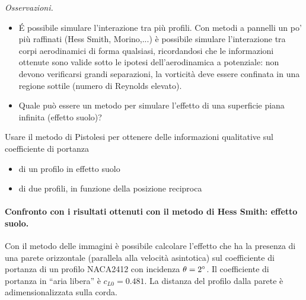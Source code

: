 \vspace{0.5cm}
\textit{Osservazioni.} 
\begin{itemize}

\item \'E possibile simulare l'interazione tra più profili. Con metodi a pannelli un po' più raffinati
   (Hess Smith, Morino,...) è possibile simulare l'interazione tra corpi aerodinamici di forma qualsiasi,
   ricordandosi che le informazioni ottenute sono valide sotto le ipotesi dell'aerodinamica a potenziale:
   non devono verificarsi grandi separazioni, la vorticità deve essere confinata in una regione sottile
   (numero di Reynolds elevato).
  

\item Quale può essere un metodo per simulare l'effetto di una superficie piana infinita (effetto suolo)?

\end{itemize}

\newpage
\clearpage

\begin{exerciseS}
Usare il metodo di Pistolesi per ottenere delle informazioni qualitative sul coefficiente
 di portanza
\begin{itemize}
 \item di un profilo in effetto suolo 
 \item di due profili, in funzione della posizione reciproca
\end{itemize}
\end{exerciseS}

\paragraph{Confronto con i risultati ottenuti con il metodo di Hess Smith:
 effetto suolo.}
Con il metodo delle immagini è possibile calcolare l'effetto che ha la
 presenza di una parete orizzontale (parallela alla velocità asintotica)
 sul coefficiente di portanza di un profilo NACA2412 con incidenza 
 $\theta = 2\degree$. Il coefficiente di portanza in ``aria libera'' è
 $c_{L0} = 0.481$. La distanza del profilo dalla parete è adimensionalizzata
 sulla corda.

